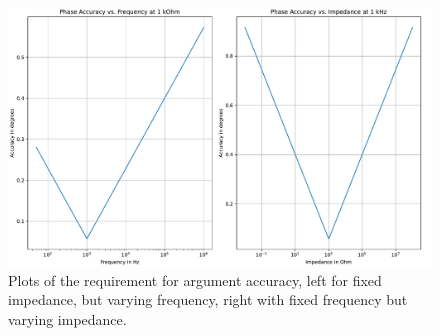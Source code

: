 \begin{figure}[H]
  \centering
  \includegraphics[width=1\textwidth]{Sections/5_SystemRequirements/Figures/PhaseSpec.pdf}
  \caption{Plots of the requirement for argument accuracy, left for fixed impedance, but varying frequency, right with fixed frequency but varying impedance.}
  \label{fig_5_PhaseAccuracy}
\end{figure}